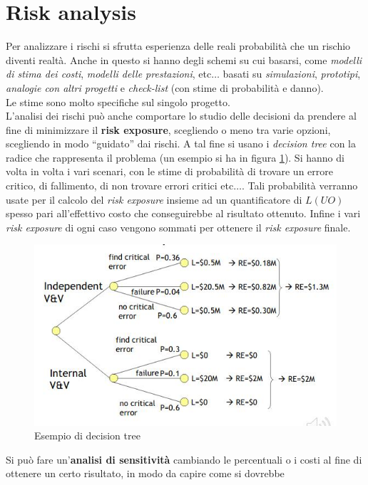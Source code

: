 \documentclass[a4paper,12pt, oneside]{book}
\begin{document}
\section{Risk analysis}
Per analizzare i rischi si sfrutta esperienza delle reali probabilità che un
rischio diventi realtà. Anche in questo si hanno degli schemi su cui basarsi,
come \textit{modelli di stima dei costi}, \textit{modelli delle prestazioni},
etc$\ldots$ basati su \textit{simulazioni}, \textit{prototipi}, \textit{analogie
  con altri progetti} e \textit{check-list} (con stime di probabilità e
danno).\\
Le stime sono molto specifiche sul singolo progetto.\\
L'analisi dei rischi può anche comportare lo studio delle decisioni da prendere
al fine di minimizzare il \textbf{risk exposure}, scegliendo o meno tra varie
opzioni, scegliendo in modo ``guidato'' dai rischi. A tal fine si usano i
\textit{decision tree} con la radice che rappresenta il problema (un esempio si
ha in figura \ref{tree}). Si hanno di volta in volta i vari scenari, con le
stime di probabilità di trovare un errore critico, di fallimento, di non trovare
errori critici etc$\ldots$. Tali probabilità verranno usate per il calcolo del
\textit{risk exposure} insieme ad un quantificatore di $L(UO)$ spesso pari
all'effettivo costo che conseguirebbe al risultato ottenuto. Infine i vari
\textit{risk exposure} di ogni caso vengono sommati per ottenere il \textit{risk
exposure} finale.
\begin{figure}
  \centering
  \includegraphics[scale = 0.7]{img/err.jpg}
  \caption{Esempio di decision tree}
  \label{tree}
\end{figure}
Si può fare un'\textbf{analisi di sensitività} cambiando le percentuali o i
costi al fine di ottenere un certo risultato, in modo da capire come si dovrebbe
\end{document}
